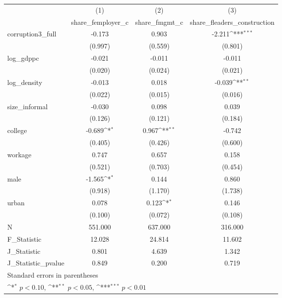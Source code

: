 {
\def\sym#1{\ifmmode^{#1}\else\(^{#1}\)\fi}
\begin{tabular}{l*{3}{c}}
\hline\hline
            &\multicolumn{1}{c}{(1)}&\multicolumn{1}{c}{(2)}&\multicolumn{1}{c}{(3)}\\
            &\multicolumn{1}{c}{share\_femployer\_c}&\multicolumn{1}{c}{share\_fmgmt\_c}&\multicolumn{1}{c}{share\_fleaders\_construction}\\
\hline
corruption3\_full&      -0.173         &       0.903         &      -2.211\sym{***}\\
            &     (0.997)         &     (0.559)         &     (0.801)         \\
[1em]
log\_gdppc   &      -0.021         &      -0.011         &      -0.011         \\
            &     (0.020)         &     (0.024)         &     (0.021)         \\
[1em]
log\_density &      -0.013         &       0.018         &      -0.039\sym{**} \\
            &     (0.022)         &     (0.015)         &     (0.016)         \\
[1em]
size\_informal&      -0.030         &       0.098         &       0.039         \\
            &     (0.126)         &     (0.121)         &     (0.184)         \\
[1em]
college     &      -0.689\sym{*}  &       0.967\sym{**} &      -0.742         \\
            &     (0.405)         &     (0.426)         &     (0.600)         \\
[1em]
workage     &       0.747         &       0.657         &       0.158         \\
            &     (0.521)         &     (0.703)         &     (0.454)         \\
[1em]
male        &      -1.565\sym{*}  &       0.144         &       0.860         \\
            &     (0.918)         &     (1.170)         &     (1.738)         \\
[1em]
urban       &       0.078         &       0.123\sym{*}  &       0.146         \\
            &     (0.100)         &     (0.072)         &     (0.108)         \\
\hline
N           &     551.000         &     637.000         &     316.000         \\
F\_Statistic &      12.028         &      24.814         &      11.602         \\
J\_Statistic &       0.801         &       4.639         &       1.342         \\
J\_Statistic\_pvalue&       0.849         &       0.200         &       0.719         \\
\hline\hline
\multicolumn{4}{l}{\footnotesize Standard errors in parentheses}\\
\multicolumn{4}{l}{\footnotesize \sym{*} \(p<0.10\), \sym{**} \(p<0.05\), \sym{***} \(p<0.01\)}\\
\end{tabular}
}
